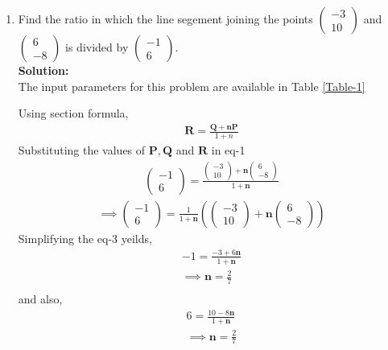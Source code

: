 \documentclass[12pt]{article}
\providecommand{\brak}[1]{\ensuremath{\left(#1\right)}}
\newcommand{\solution}{\noindent \textbf{Solution: }}
\newcommand{\myvec}[1]{\ensuremath{\begin{pmatrix}#1\end{pmatrix}}}
\let\vec\mathbf
\begin{document}
\begin{enumerate}

\item Find the ratio in which the line segement joining the points $\myvec{-3 \\ 10}$ and $\myvec{6\\-8}$ is divided by $\myvec{-1\\6}$.\\

\solution \\The input parameters for this problem are available in Table \eqref{Table-1}
\begin{table}[ht!]

\caption{}
\label{Table-1}	
\end{table}

Using section formula,
\begin{align}
	 \vec{R}=\frac{\vec{Q}+\vec{n}\vec{P}}{1+n}
\end{align}
Substituting the values of $\vec{P},\vec{Q}$ and $\vec{R}$ in eq-1
\begin{align}
	 \myvec{-1\\6}=\frac{{\myvec{-3\\10}+\vec{n}\myvec{6\\-8}}}{1+\vec{n}}
\end{align}
\begin{align}
	 \implies \myvec{-1\\6}=\frac{1}{1+\vec{n}}\brak{{\myvec{-3\\10}+\vec{n}\myvec{6\\-8}}}
\end{align}
Simplifying the eq-3 yeilds,
\begin{multline}
	  -1=\frac{-3+6\vec{n}}{1+\vec{n}}\\
	 \implies \vec{n}=\frac{2}{7}\\
\end{multline}
and also,
\begin{multline}
	 6=\frac{10-8\vec{n}}{1+\vec{n}}\\
	  \implies \vec{n}=\frac{2}{7}\\
\end{multline}



\end{enumerate}
\end{document}
